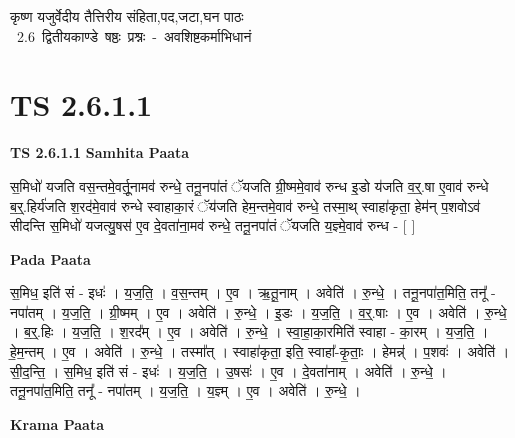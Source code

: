 \documentclass[17pt]{extarticle}
\begin{document}
\begin{titlepage}
    \begin{center}
 
\begin{sanskrit}
    { \Huge
    कृष्ण यजुर्वेदीय तैत्तिरीय संहिता,पद,जटा,घन पाठः 
    }
    \\
    \vspace{2.5cm}
    \mbox{ \Huge
    2.6      द्वितीयकाण्डे षष्ठः प्रश्नः - अवशिष्टकर्माभिधानं   }
\end{sanskrit}
\end{center}

\end{titlepage}
\tableofcontents
\pagebreak

\section*{ TS 2.6.1.1 }

\textbf{TS 2.6.1.1 } \newline
\textbf{Samhita Paata} \newline

स॒मिधो॑ यजति वस॒न्तमे॒वर्तू॒नामव॑ रुन्धे॒ तनू॒नपा॑तं ॅयजति ग्री॒ष्ममे॒वाव॑ रुन्ध इ॒डो य॑जति व॒र्॒.षा ए॒वाव॑ रुन्धे ब॒र्॒.हिर्य॑जति श॒रद॑मे॒वाव॑ रुन्धे स्वाहाका॒रं ॅय॑जति हेम॒न्तमे॒वाव॑ रुन्धे॒ तस्मा॒थ् स्वाहा॑कृता॒ हेम॑न् प॒शवोऽव॑ सीदन्ति स॒मिधो॑ यजत्यु॒षस॑ ए॒व दे॒वता॑ना॒मव॑ रुन्धे॒ तनू॒नपा॑तं ॅयजति य॒ज्ञ्मे॒वाव॑ रुन्ध - [  ] \newline

\textbf{Pada Paata} \newline

स॒मिध॒ इति॑ सं - इधः॑ । य॒ज॒ति॒ । व॒स॒न्तम् । ए॒व । ऋ॒तू॒नाम् । अवेति॑ । रु॒न्धे॒ । तनू॒नपा॑त॒मिति॒ तनू᳚ - नपा॑तम् । य॒ज॒ति॒ । ग्री॒ष्मम् । ए॒व । अवेति॑ । रु॒न्धे॒ । इ॒डः । य॒ज॒ति॒ । व॒र्॒.षाः । ए॒व । अवेति॑ । रु॒न्धे॒ । ब॒र्॒.हिः । य॒ज॒ति॒ । श॒रद᳚म् । ए॒व । अवेति॑ । रु॒न्धे॒ । स्वा॒हा॒का॒रमिति॑ स्वाहा - का॒रम् । य॒ज॒ति॒ । हे॒म॒न्तम् । ए॒व । अवेति॑ । रु॒न्धे॒ । तस्मा᳚त् । स्वाहा॑कृता॒ इति॒ स्वाहा᳚-कृ॒ताः॒ । हेमन्न्॑ । प॒शवः॑ । अवेति॑ । सी॒द॒न्ति॒ । स॒मिध॒ इति॑ सं - इधः॑ । य॒ज॒ति॒ । उ॒षसः॑ । ए॒व । दे॒वता॑नाम् । अवेति॑ । रु॒न्धे॒ । तनू॒नपा॑त॒मिति॒ तनू᳚ - नपा॑तम् । य॒ज॒ति॒ । य॒ज्ञ्म् । ए॒व । अवेति॑ । रु॒न्धे॒ ।  \newline


\textbf{Krama Paata} \newline
\end{document}
